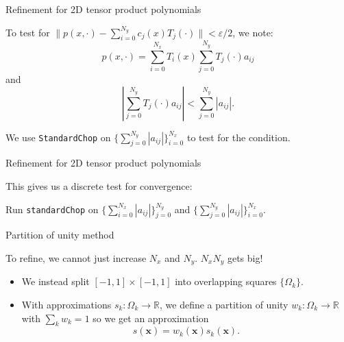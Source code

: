 \documentclass{beamer}
\newcommand{\R}{\mathbb{R}}
\newcommand{\vect}[1]{\mathbf{#1}}
\begin{document}
\begin{frame}{Refinement for 2D tensor product polynomials}
\begin{center}
To test for $\|p(x,\cdot) - \sum_{i=0}^{N_y} c_j(x)T_j(\cdot)\|<\varepsilon/2$, we note: $$p(x,\cdot)=\sum_{i=0}^{N_x} T_i(x) \sum_{j=0}^{N_y} T_j(\cdot)a_{ij}$$
and
$$ \left | \sum_{j=0}^{N_y} T_j(\cdot)a_{ij} \right | < \sum_{j=0}^{N_y} |a_{ij}|. $$
\end{center}

\begin{center}
We use {\tt StandardChop} on $\{ \sum_{j=0}^{N_y} |a_{ij}|  \}_{i=0}^{N_x}$ to test for the condition.
\end{center}
\end{frame}

\begin{frame}{Refinement for 2D tensor product polynomials}
\begin{center}
This gives us a discrete test for convergence:
\end{center}

\begin{center}
Run	{\tt standardChop} on $\{ \sum_{i=0}^{N_x} |a_{ij}|  \}_{j=0}^{N_y}$ and $\{ \sum_{j=0}^{N_y} |a_{ij}|  \}_{i=0}^{N_x}$.
\end{center}

\end{frame}

\begin{frame}{Partition of unity method}
\begin{center}
To refine, we cannot just increase $N_x$ and $N_y$. $N_x N_y$ gets big!
\end{center}

\begin{itemize}
\item We instead split $[-1,1] \times [-1,1]$ into overlapping squares $\{ \Omega_k \}$.
\item With approximations $s_k:\Omega_k \to \R$, we define a partition of unity $w_k:\Omega_k \to \R$ with $\sum_k w_k=1$ so we get an approximation $$s(\vect{x}) = w_k(\vect{x})s_k(\vect{x}).$$
\end{itemize}

\end{frame}
\end{document}
